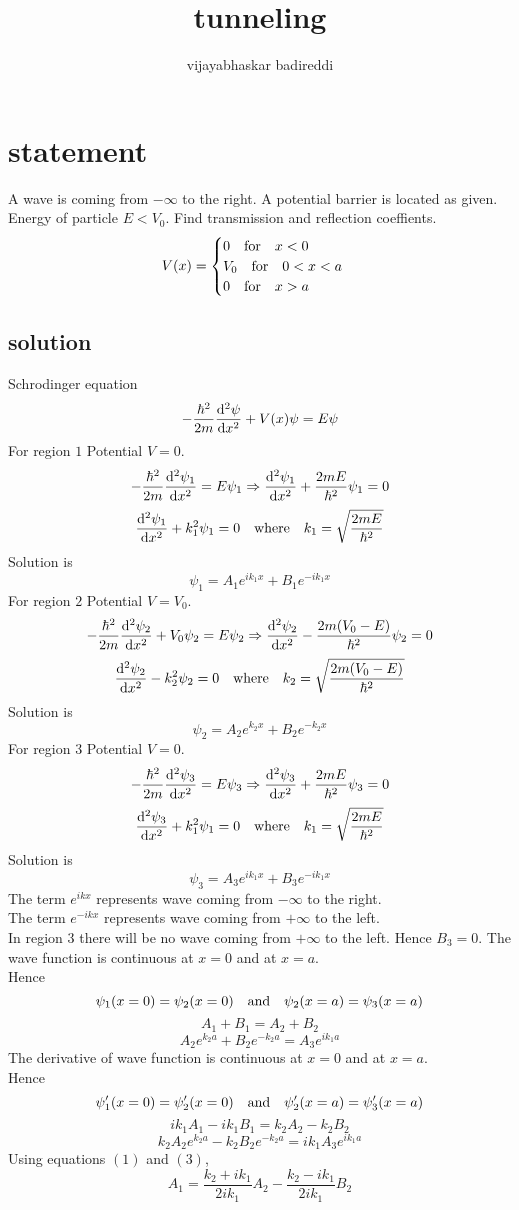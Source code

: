 \documentclass[12pt]{article}
\title{tunneling}
\author{vijayabhaskar badireddi}
\begin{document}
\section*{statement}
A wave is coming from $-\infty$ to the right. A potential barrier is located as given. 
Energy of particle $E<V_0$. Find transmission and reflection coeffients.
$$
V(x)=
\begin{cases}
    0 \qq{for} x < 0 \\
    V_0 \qq{for} 0 < x < a \\
    0 \qq{for} x > a
\end{cases}
$$
\subsection*{solution}
Schrodinger equation 
\[-\frac{\hbar^2}{2m}\dv[2]{\psi}{x}+V(x)\psi=E\psi\]
For region $1$ Potential $V=0$. 
\[-\frac{\hbar^2}{2m}\dv[2]{\psi_1}{x}=E\psi_1\Rightarrow \dv[2]{\psi_1}{x}+\frac{2mE}{\hbar^2}\psi_1=0\]
\[\dv[2]{\psi_1}{x}+k_1^2\psi_1=0\qq{where} k_1=\sqrt{\frac{2mE}{\hbar^2}}\]
Solution is 
\[\psi_1=A_1e^{ik_1x}+B_1e^{-ik_1x}\]
For region $2$ Potential $V=V_0$. 
\[-\frac{\hbar^2}{2m}\dv[2]{\psi_2}{x}+V_0\psi_2=E\psi_2\Rightarrow \dv[2]{\psi_2}{x}-\frac{2m(V_0-E)}{\hbar^2}\psi_2=0\]
\[\dv[2]{\psi_2}{x}-k_2^2\psi_2=0\qq{where} k_2=\sqrt{\frac{2m(V_0-E)}{\hbar^2}}\]
Solution is 
\[\psi_2=A_2e^{k_2x}+B_2e^{-k_2x}\]
For region $3$ Potential $V=0$. 
\[-\frac{\hbar^2}{2m}\dv[2]{\psi_3}{x}=E\psi_3\Rightarrow \dv[2]{\psi_3}{x}+\frac{2mE}{\hbar^2}\psi_3=0\]
\[\dv[2]{\psi_3}{x}+k_1^2\psi_1=0\qq{where} k_1=\sqrt{\frac{2mE}{\hbar^2}}\]
Solution is 
\[\psi_3=A_3e^{ik_1x}+B_3e^{-ik_1x}\]
\newpage
The term $e^{ikx}$ represents wave coming from $-\infty$ to the right.\\
The term $e^{-ikx}$ represents wave coming from $+\infty$ to the left.\\
In region $3$ there will be no wave coming from $+\infty$ to the left. Hence $B_3=0$.
The wave function is continuous at $x=0$ and at $x=a$.\\
Hence 
\[\psi_1(x=0)=\psi_2(x=0) \qq{and} \psi_2(x=a)=\psi_3(x=a)\]
\[A_1+B_1=A_2+B_2\tag{1}\]
\[A_2e^{k_2a}+B_2e^{-k_2a}=A_3e^{ik_1a}\tag{2}\]
The derivative of wave function is continuous at $x=0$ and at $x=a$.\\
Hence 
\[\psi'_1(x=0)=\psi'_2(x=0) \qq{and} \psi'_2(x=a)=\psi'_3(x=a)\]
\[ik_1A_1-ik_1B_1=k_2A_2-k_2B_2\tag{3}\]
\[k_2A_2e^{k_2a}-k_2B_2e^{-k_2a}=ik_1A_3e^{ik_1a}\tag{4}\]
Using equations $(1)$ and $(3)$,
\[A_1=\frac{k_2+ik_1}{2ik_1}A_2-\frac{k_2-ik_1}{2ik_1}B_2\]
\end{document}
